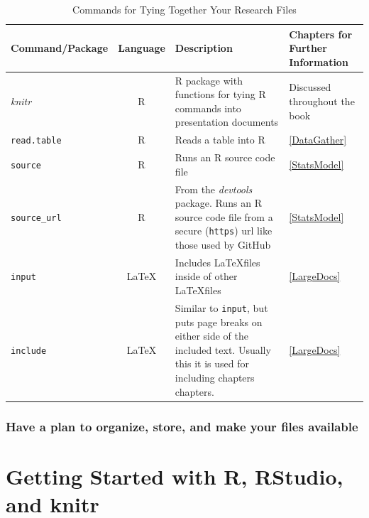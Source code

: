 \documentclass[ChapterTOCs,krantz1]{krantz}\usepackage{graphicx, color}
\begin{document}
\begin{landscape}
\begin{table}
    \caption{Commands for Tying Together Your Research Files}
    \label{TableTieCommands}
    \vspace{0.3cm}
    \begin{tabular}{l c  p{6.5cm}  m{4cm}}
        \hline
        Command/Package & Language & Description & Chapters for Further Information \\  
        \hline \hline
        {\emph{knitr}} & R & R package with functions for tying R commands into presentation documents & Discussed throughout the book \\
        {\tt{read.table}} & R & Reads a table into R & \ref{DataGather} \\
        {\tt{source}} & R & Runs an R source code file & \ref{StatsModel} \\
        {\tt{source\_url}} & R & From the {\emph{devtools}} package. Runs an R source code file from a secure ({\tt{https}}) url like those used by GitHub & \ref{StatsModel} \\
        {\tt{input}} & \LaTeX & Includes \LaTeX files inside of other \LaTeX files & \ref{LargeDocs} \\
        {\tt{include}} & \LaTeX & Similar to {\tt{input}}, but puts page breaks on either side of the included text. Usually this it is used for including chapters chapters. & \ref{LargeDocs} \\
        
        \hline 
        
    \end{tabular}
\end{table}
\end{landscape}


\subsection{Have a plan to organize, store, and make your files available}





\chapter{Getting Started with R, RStudio, and knitr}\label{GettingStarted}
\end{document}
